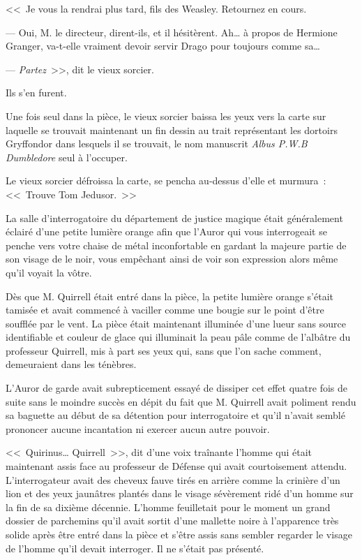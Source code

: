 <<~Je vous la rendrai plus tard, fils des Weasley. Retournez en cours.

--- Oui, M. le directeur, dirent-ils, et il hésitèrent. Ah… à propos de Hermione Granger, va-t-elle vraiment devoir servir Drago pour toujours comme sa…

--- \emph{Partez}~>>, dit le vieux sorcier.

Ils s'en furent.

Une fois seul dans la pièce, le vieux sorcier baissa les yeux vers la carte sur laquelle se trouvait maintenant un fin dessin au trait représentant les dortoirs Gryffondor dans lesquels il se trouvait, le nom manuscrit \emph{Albus P.W.B Dumbledore} seul à l'occuper.

Le vieux sorcier défroissa la carte, se pencha au-dessus d'elle et murmura~: <<~Trouve Tom Jedusor.~>>

\later

La salle d'interrogatoire du département de justice magique était généralement éclairé d'une petite lumière orange afin que l'Auror qui vous interrogeait se penche vers votre chaise de métal inconfortable en gardant la majeure partie de son visage de le noir, vous empêchant ainsi de voir son expression alors même qu'il voyait la vôtre.

Dès que M. Quirrell était entré dans la pièce, la petite lumière orange s'était tamisée et avait commencé à vaciller comme une bougie sur le point d'être soufflée par le vent. La pièce était maintenant illuminée d'une lueur sans source identifiable et couleur de glace qui illuminait la peau pâle comme de l'albâtre du professeur Quirrell, mis à part ses yeux qui, sans que l'on sache comment, demeuraient dans les ténèbres.

L'Auror de garde avait subrepticement essayé de dissiper cet effet quatre fois de suite sans le moindre succès en dépit du fait que M. Quirrell avait poliment rendu sa baguette au début de sa détention pour interrogatoire et qu'il n'avait semblé prononcer aucune incantation ni exercer aucun autre pouvoir.

<<~Quirinus… Quirrell~>>, dit d'une voix traînante l'homme qui était maintenant assis face au professeur de Défense qui avait courtoisement attendu. L'interrogateur avait des cheveux fauve tirés en arrière comme la crinière d'un lion et des yeux jaunâtres plantés dans le visage sévèrement ridé d'un homme sur la fin de sa dixième décennie. L'homme feuilletait pour le moment un grand dossier de parchemins qu'il avait sortit d'une mallette noire à l'apparence très solide après être entré dans la pièce et s'être assis sans sembler regarder le visage de l'homme qu'il devait interroger. Il ne s'était pas présenté.

